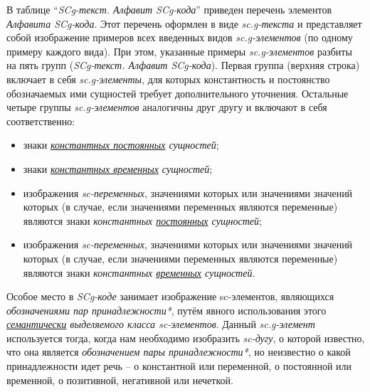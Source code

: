 \begin{SCn}
\end{SCn}

В таблице ``\textit{SCg-текст. Алфавит SCg-кода}'' приведен перечень элементов \textit{Алфавита SCg-кода}.
Этот перечень оформлен в виде \textit{sc.g-текста} и представляет собой изображение примеров всех введенных видов \textit{sc.g-элементов} (по одному примеру каждого вида). При этом, указанные примеры \textit{sc.g-элементов} разбиты на пять групп (\textit{SCg-текст. Алфавит SCg-кода}). Первая группа (верхняя строка) включает в себя \textit{sc.g-элементы}, для которых константность и постоянство обозначаемых ими сущностей требует дополнительного уточнения. Остальные четыре группы \textit{sc.g-элементов} аналогичны друг другу и включают в себя соответственно:

\begin{itemize}
	\item знаки \textit{\uline{константных постоянных} сущностей};
	\item знаки \textit{\uline{константных временных} сущностей};
	\item изображения \textit{sc-переменных}, значениями которых или значениями значений которых (в случае, если значениями переменных являются переменные) являются знаки \textit{константных \uline{постоянных} сущностей};
	\item изображения \textit{sc-переменных}, значениями которых или значениями значений которых (в случае, если значениями переменных являются переменные) являются знаки \textit{константных \uline{временных} сущностей}.
\end{itemize}

Особое место в \textit{SCg-коде} занимает изображение sc-элементов, являющихся \textit{обозначениями пар принадлежности*}, путём явного использования этого \textit {\uline{семантически} выделяемого класса sc-элементов}.
Данный \textit{sc.g-элемент} используется тогда, когда нам необходимо изобразить \textit{sc-дугу}, о которой известно, что она является \textit{обозначением пары принадлежности*}, но неизвестно о какой принадлежности идет речь -- о константной или переменной, о постоянной или временной, о позитивной, негативной или нечеткой.


